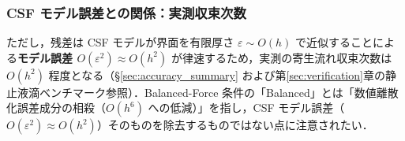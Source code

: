 \subsubsection{CSF モデル誤差との関係：実測収束次数}

ただし，残差は CSF モデルが界面を有限厚さ $\varepsilon \sim O(h)$ で近似することによる\textbf{モデル誤差 $O(\varepsilon^2) \approx O(h^2)$} が律速するため，実測の寄生流れ収束次数は $O(h^2)$ 程度となる（§\ref{sec:accuracy_summary} および第\ref{sec:verification}章の静止液滴ベンチマーク参照）．Balanced-Force 条件の「Balanced」とは「数値離散化誤差成分の相殺（$O(h^6)$ への低減）」を指し，CSF モデル誤差（$O(\varepsilon^2) \approx O(h^2)$）そのものを除去するものではない点に注意されたい．
